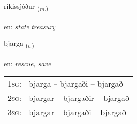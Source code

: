 \documentclass[frontgrid, backgrid]{flacards}\usepackage[]{graphicx}\usepackage[]{color}
\begin{document}
\renewcommand{\flhead}{\vskip5pt \fboxsep=0pt {\small\bfseries\footnotesize Nafnorð | Noun}}
\renewcommand{\fcfoot}{\vskip5pt \fboxsep=0pt \hspace{2pt}{\small\bfseries\footnotesize 2K}}

\renewcommand{\blhead}{\vskip5pt {\small\bfseries\footnotesize Nafnorð | Noun }}
\renewcommand{\bcfoot}{\vskip5pt \hspace{2pt}{\small\bfseries\footnotesize 2K}}


{ríkissjóður \small{\textsubscript{(\textit{m.})}} \\[1ex] %
\textphonetic{[riːcɪsjouðʏr]} \\
en: \emph{state treasury} \\  [2ex]
\renewcommand*{\arraystretch}{0.8}
}

\renewcommand{\flhead}{\vskip5pt \fboxsep=0pt {\small\bfseries\footnotesize Sagnorð | Verb}}
\renewcommand{\fcfoot}{\vskip5pt \fboxsep=0pt \hspace{2pt}{\small\bfseries\footnotesize 2K}}

\renewcommand{\blhead}{\vskip5pt {\small\bfseries\footnotesize Sagnorð | Verb }}
\renewcommand{\bcfoot}{\vskip5pt \hspace{2pt}{\small\bfseries\footnotesize 2K}}


{bjarga \small{\textsubscript{(\textit{v.})}} \\[1ex] %
\textphonetic{[pjarka]} \\
en: \emph{rescue, save} \\  [2ex]
\renewcommand*{\arraystretch}{0.8}
\begin{tabular}{p{1cm}l}
\textsc{1sg}: & bjarga -- bjargaði -- bjargað \\ 
\textsc{2sg}: & bjargar -- bjargaðir -- bjargað \\ 
\textsc{3sg}: & bjargar -- bjargaði -- bjargað \\ 
\end{tabular}
}
\end{document}
